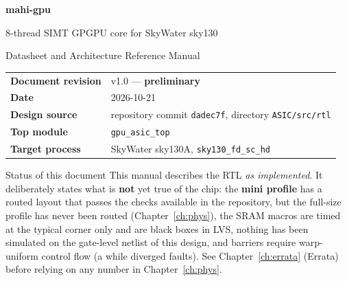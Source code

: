 \documentclass[10pt,a4paper]{report}
\newcommand{\ins}[1]{\texttt{\detokenize{#1}}}
\begin{document}
\begin{titlepage}
\thispagestyle{empty}
\vspace*{1.2cm}
{\color{white}\sffamily\bfseries\fontsize{40}{44}\selectfont mahi-gpu\par}
\vspace{0.3cm}
{\color{white}\sffamily\Large 8-thread SIMT GPGPU core for SkyWater sky130\par}
\vspace{0.3cm}
{\color{white}\sffamily\large Datasheet and Architecture Reference Manual\par}
\vspace{4.3cm}
\begin{tabular}{@{}ll@{}}
\sffamily\bfseries Document revision & v1.0 --- \textbf{preliminary}\\
\sffamily\bfseries Date & 2026-10-21\\
\sffamily\bfseries Design source & repository commit \texttt{dadec7f}, directory \texttt{ASIC/src/rtl}\\
\sffamily\bfseries Top module & \texttt{gpu\_asic\_top}\\
\sffamily\bfseries Target process & SkyWater sky130A, \texttt{sky130\_fd\_sc\_hd}\\
\end{tabular}
\vfill
\begin{statbox}{Status of this document}
This manual describes the RTL \emph{as implemented}. It deliberately states what is \textbf{not} yet true of the chip:
the \textbf{mini profile} has a routed layout that passes the checks available in the repository, but the full-size profile has never been routed (Chapter~\ref{ch:phys}),
the SRAM macros are timed at the typical corner only and are black boxes in LVS, nothing has been simulated on the gate-level netlist of this design, and barriers require warp-uniform control flow
(a \ins{SYNC} while diverged faults). See Chapter~\ref{ch:errata} (Errata) before relying on any number in Chapter~\ref{ch:phys}.
\end{statbox}
\end{titlepage}
\end{document}
